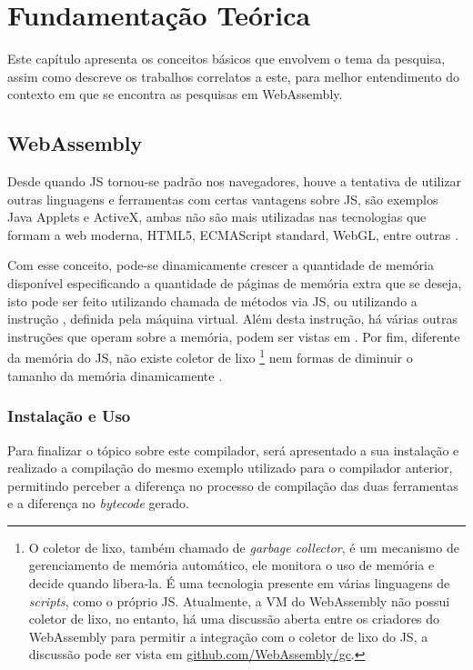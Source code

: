 
\chapter{Fundamentação Teórica}\label{fundamentacao}

Este capítulo apresenta os conceitos básicos que envolvem o tema da pesquisa, assim como descreve os trabalhos correlatos a este, para melhor entendimento do contexto em que se encontra as pesquisas em WebAssembly.

\section{WebAssembly}

Desde quando JS tornou-se padrão nos navegadores, houve a tentativa de utilizar outras linguagens e ferramentas com certas vantagens sobre JS, são exemplos Java Applets e ActiveX, ambas não são mais utilizadas nas tecnologias que formam a web moderna, \gls{HTML5}, ECMAScript standard, WebGL, entre outras \cite{wasm_predecessors}.

Com esse conceito, pode-se dinamicamente crescer a quantidade de memória disponível especificando a quantidade de páginas de memória extra que se deseja, isto pode ser feito utilizando chamada de métodos via JS, ou utilizando a instrução , definida pela máquina virtual. Além desta instrução, há várias outras instruções que operam sobre a memória, podem ser vistas em . Por fim, diferente da memória do JS, não existe coletor de lixo
\footnote{O coletor de lixo, também chamado de \textit{garbage collector}, é um mecanismo de gerenciamento de memória automático, ele monitora o uso de memória e decide quando libera-la. É uma tecnologia presente em várias linguagens de \textit{scripts}, como o próprio JS. Atualmente, a VM do WebAssembly não possui coletor de lixo, no entanto, há uma discussão aberta entre os criadores do WebAssembly para permitir a integração com o coletor de lixo do JS, a discussão pode ser vista em \href{https://github.com/WebAssembly/gc}{github.com/WebAssembly/gc}.}
nem formas de diminuir o tamanho da memória dinamicamente \cite{definitive_guide}.

\subsection{Instalação e Uso}

Para finalizar o tópico sobre este compilador, será apresentado a sua instalação e realizado a compilação do mesmo exemplo utilizado para o compilador anterior, permitindo perceber a diferença no processo de compilação das duas ferramentas e a diferença no \textit{bytecode} gerado.

